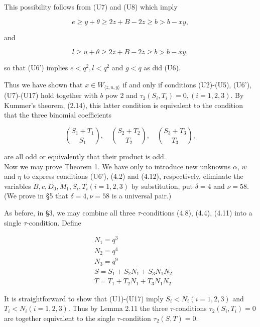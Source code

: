 \documentclass[11pt,a4paper]{article}
\newcommand{\origpage}[1]{\marginnote{\footnotesize\textbf{[#1]}}}
\begin{document}
This possibility follows from (U7) and (U8) which imply

\[
e \geq y+\theta \geq 2 z+B-2 z \geq b>b-x y,
\]

and

\[
l \geq u+\theta \geq 2 z+B-2 z \geq b>b-x y,
\]

so that (U6') implies $e<q^{2},\allowbreak  l<q^{2}$ and $g<q$ as did (U6).

\origpage{567}Thus we have shown that $x \in W_{\langle z, u, y\rangle}$ if and only if conditions (U2)-(U5), (U6'), (U7)-(U17) hold together with $b$ pow 2 and $\tau_{2}\left(S_{i},\allowbreak  T_{i}\right)=0,\allowbreak (i=1,\allowbreak 2,\allowbreak 3)$. By Kummer's theorem, (2.14), this latter condition is equivalent to the condition that the three binomial coefficients


\begin{equation*}
\binom{S_{1}+T_{1}}{S_{1}}, \quad\binom{S_{2}+T_{2}}{T_{2}}, \quad\binom{S_{3}+T_{3}}{T_{3}}, \tag{4.12}
\end{equation*}


are all odd or equivalently that their product is odd.\\
Now we may prove Theorem 1. We have only to introduce new unknowns $\alpha$, $w$ and $\eta$ to express conditions (U6'), (4.2) and (4.12), respectively, eliminate the variables $B,\allowbreak  c,\allowbreak  D_{0},\allowbreak  M_{1},\allowbreak  S_{i},\allowbreak  T_{i}(i=1,\allowbreak 2,\allowbreak 3)$ by substitution, put $\delta=4$ and $\nu=58$. (We prove in §5 that $\delta=4,\allowbreak  \nu=58$ is a universal pair.)

As before, in §3, we may combine all three $\tau$-conditions (4.8), (4.4), (4.11) into a single $\tau$-condition. Define


\begin{align*}
& N_{1}=q^{3}  \tag{U18}\\
& N_{2}=q^{4}  \tag{U19}\\
& N_{3}=q^{9}  \tag{U20}\\
& S=S_{1}+S_{2} N_{1}+S_{3} N_{1} N_{2}  \tag{U21}\\
& T=T_{1}+T_{2} N_{1}+T_{3} N_{1} N_{2} \tag{U22}
\end{align*}


It is straightforward to show that (U1)-(U17) imply $S_{i}<N_{i}(i=1,\allowbreak 2,\allowbreak 3)$ and $T_{i}<N_{i}(i=1,\allowbreak 2,\allowbreak 3)$. Thus by Lemma 2.11 the three $\tau$-conditions $\tau_{2}\left(S_{i},\allowbreak  T_{i}\right)=0$ are together equivalent to the single $\tau$-condition $\tau_{2}(S,\allowbreak  T)=0$.
\end{document}
